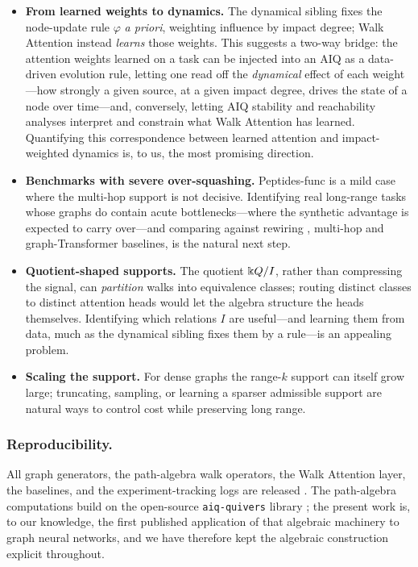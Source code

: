 \begin{itemize}
  \item \textbf{From learned weights to dynamics.} The dynamical sibling
  \cite{zainea2026aiq} fixes the node-update rule $\varphi$ \emph{a priori},
  weighting influence by impact degree; Walk Attention instead \emph{learns}
  those weights. This suggests a two-way bridge: the attention weights learned on
  a task can be injected into an AIQ as a data-driven evolution rule, letting one
  read off the \emph{dynamical} effect of each weight---how strongly a given
  source, at a given impact degree, drives the state of a node over time---and,
  conversely, letting AIQ stability and reachability analyses interpret and
  constrain what Walk Attention has learned. Quantifying this correspondence
  between learned attention and impact-weighted dynamics is, to us, the most
  promising direction.
  \item \textbf{Benchmarks with severe over-squashing.} Peptides-func is a mild
  case where the multi-hop support is not decisive. Identifying real long-range
  tasks whose graphs do contain acute bottlenecks---where the synthetic advantage
  is expected to carry over---and comparing against rewiring
  \cite{topping2022understanding}, multi-hop \cite{gutteridge2023drew} and
  graph-Transformer baselines, is the natural next step.
  \item \textbf{Quotient-shaped supports.} The quotient $\Bbbk Q/I$, rather than
  compressing the signal, can \emph{partition} walks into equivalence classes;
  routing distinct classes to distinct attention heads would let the algebra
  structure the heads themselves. Identifying which relations $I$ are useful---and
  learning them from data, much as the dynamical sibling fixes them by a rule---is
  an appealing problem.
  \item \textbf{Scaling the support.} For dense graphs the range-$k$ support can
  itself grow large; truncating, sampling, or learning a sparser admissible
  support are natural ways to control cost while preserving long range.
\end{itemize}

\subsubsection*{Reproducibility.}
All graph generators, the path-algebra walk operators, the Walk Attention layer,
the baselines, and the experiment-tracking logs are released
\cite{repo_walkattention}. The path-algebra computations build on the open-source
\texttt{aiq-quivers} library \cite{repo_aiqquivers}; the present work is, to our
knowledge, the first published application of that algebraic machinery to graph
neural networks, and we have therefore kept the algebraic construction explicit
throughout.
